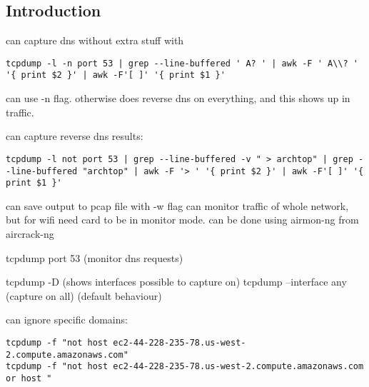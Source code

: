 
\subsection{Introduction}

can capture dns without extra stuff with
\begin{verbatim}
tcpdump -l -n port 53 | grep --line-buffered ' A? ' | awk -F ' A\\? ' '{ print $2 }' | awk -F'[ ]' '{ print $1 }'
\end{verbatim}

can use -n flag. otherwise does reverse dns on everything, and this shows up in traffic.

can capture reverse dns results:
\begin{verbatim}
tcpdump -l not port 53 | grep --line-buffered -v " > archtop" | grep --line-buffered "archtop" | awk -F '> ' '{ print $2 }' | awk -F'[ ]' '{ print $1 }'
\end{verbatim}

can save output to pcap file with -w flag
can monitor traffic of whole network, but for wifi need card to be in monitor mode. can be done using airmon-ng from aircrack-ng

tcpdump port 53 (monitor dns requests)

tcpdump -D (shows interfaces possible to capture on)
tcpdump --interface any (capture on all) (default behaviour)

can ignore specific domains:
\begin{verbatim}
tcpdump -f "not host ec2-44-228-235-78.us-west-2.compute.amazonaws.com"
tcpdump -f "not host ec2-44-228-235-78.us-west-2.compute.amazonaws.com or host "
\end{verbatim}

